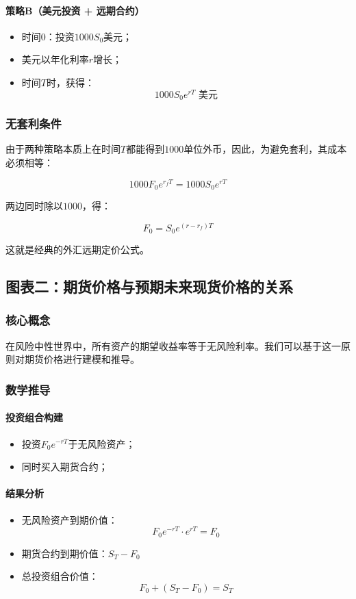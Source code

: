 \paragraph{策略B（美元投资 + 远期合约）}
\begin{itemize}
  \item 时间$0$：投资$1000S_0$美元；
  \item 美元以年化利率$r$增长；
  \item 时间$T$时，获得：
  \[
  1000S_0 e^{rT} \text{ 美元}
  \]
\end{itemize}

\subsubsection{无套利条件}

由于两种策略本质上在时间$T$都能得到$1000$单位外币，因此，为避免套利，其成本必须相等：

\[
1000F_0 e^{r_f T} = 1000S_0 e^{rT}
\]

两边同时除以$1000$，得：

\[
F_0 = S_0 e^{(r - r_f)T}
\]

这就是经典的外汇远期定价公式。

\subsection{图表二：期货价格与预期未来现货价格的关系}

\subsubsection{核心概念}

在风险中性世界中，所有资产的期望收益率等于无风险利率。我们可以基于这一原则对期货价格进行建模和推导。

\subsubsection{数学推导}

\paragraph{投资组合构建}
\begin{itemize}
  \item 投资$F_0 e^{-rT}$于无风险资产；
  \item 同时买入期货合约；
\end{itemize}

\paragraph{结果分析}
\begin{itemize}
  \item 无风险资产到期价值：
  \[
  F_0 e^{-rT} \cdot e^{rT} = F_0
  \]
  \item 期货合约到期价值：$S_T - F_0$
  \item 总投资组合价值：
  \[
  F_0 + (S_T - F_0) = S_T
  \]
\end{itemize}

